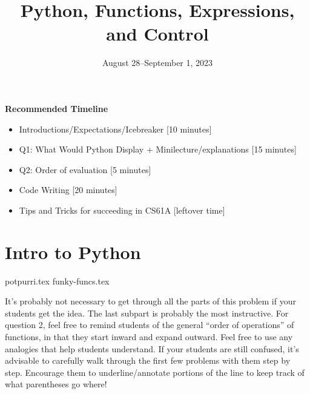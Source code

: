 \documentclass{exam}
\title{Python, Functions, Expressions, and Control}
\date{August 28--September 1, 2023}
\begin{document}
\maketitle
\begin{meta}
\textbf{Recommended Timeline}
\begin{itemize}
  \item Introductions/Expectations/Icebreaker [10 minutes]
  \item Q1: What Would Python Display + Minilecture/explanations [15 minutes]
  \item Q2: Order of evaluation [5 minutes]
  \item Code Writing [20 minutes]
  \item Tips and Tricks for succeeding in CS61A [leftover time]
\end{itemize}
\end{meta}


\section{Intro to Python}
\begin{questions}
{potpurri.tex}
{funky-funcs.tex}
\begin{questionmeta}
  It's probably not necessary to get through all the parts of this problem if your students get the idea. The last subpart is probably the most instructive. 
  For question 2, feel free to remind students of the general ``order of operations'' of functions, in that they start inward and expand outward. Feel free to use any analogies that help students understand.
  If your students are still confused, it's advisable to carefully walk through the first few problems with them step by step. Encourage them to underline/annotate portions of the line to keep track of what parentheses go where!
\end{questionmeta}
\end{questions}
\end{document}
